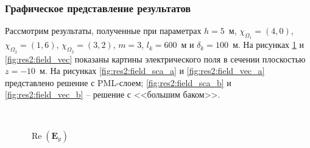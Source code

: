 \documentclass[a4paper,12pt]{article}
\renewcommand{\Re}{\mathop{\mathrm{Re}}\nolimits}
\begin{document}
\subsubsection{Графическое представление результатов}
Рассмотрим результаты, полученные при параметрах $h=5$~м, $\chi_{\Omega_1} = (4, 0)$, $\chi_{\Omega_2} = (1, 6)$, $\chi_{\Omega_2} = (3, 2)$, $m=3$, $l_k = 600$~м и $\delta_k = 100$~м. На рисунках \ref{fig:res2:field_sca} и \ref{fig:res2:field_vec} показаны картины электрического поля в сечении плоскостью $z = -10$~м. На рисунках \ref{fig:res2:field_sca_a} и \ref{fig:res2:field_vec_a} представлено решение с PML-слоем; \ref{fig:res2:field_sca_b} и \ref{fig:res2:field_vec_b} -- решение с <<большим баком>>.

\begin{figure}[H]
	\centering
	~~
	\caption{$\Re(\mathbf{E}_y)$}
	\label{fig:res2:field_sca}
\end{figure}
\end{document}
